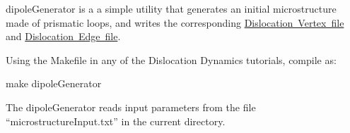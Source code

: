 dipole\+Generator is a a simple utility that generates an initial microstructure made of prismatic loops, and writes the corresponding \mbox{\hyperlink{_d_d_vertex}{Dislocation Vertex file}} and \mbox{\hyperlink{_d_d_edge}{Dislocation Edge file}}.

Using the Makefile in any of the Dislocation Dynamics tutorials, compile as\+: \begin{DoxyVerb}make dipoleGenerator
\end{DoxyVerb}


The dipole\+Generator reads input parameters from the file “microstructure\+Input.\+txt” in the current directory. 